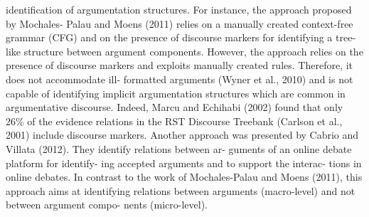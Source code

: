 identification of argumentation structures. For instance, the approach proposed by Mochales- Palau and Moens (2011) relies on a manually created context-free grammar (CFG) and on the presence of discourse markers for identifying a tree-like structure between argument components. However, the approach relies on the presence of discourse markers and exploits manually created rules. Therefore, it does not accommodate ill- formatted arguments (Wyner et al., 2010) and is not capable of identifying implicit argumentation structures which are common in argumentative discourse. Indeed, Marcu and Echihabi (2002) found that only 26\% of the evidence relations in the RST Discourse Treebank (Carlson et al., 2001) include discourse markers. Another approach was presented by Cabrio and Villata (2012). They identify relations between ar- guments of an online debate platform for identify- ing accepted arguments and to support the interac- tions in online debates. In contrast to the work of Mochales-Palau and Moens (2011), this approach aims at identifying relations between arguments (macro-level) and not between argument compo- nents (micro-level).